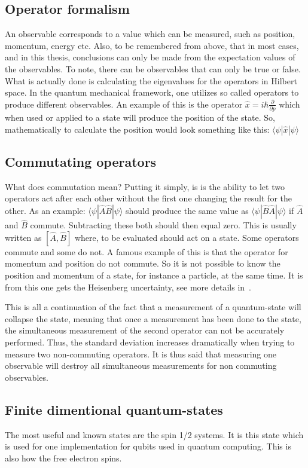 \documentclass[
  utf8,%
  parskip,%
  largesmallcaps,intlimits,widermath,%
  sharecounter,nobreak,definition=marks,%
  noparts%
]{rtthesis}
\begin{document}
\subsection{Operator formalism}\label{sec:intro:Background of quantum mechanics:Operator formalism}
An observable corresponds to a value which can be measured, such as position, momentum, energy etc. Also, to be remembered from above, that in most cases, and in this thesis, conclusions can only be made from the expectation values of the observables. To note, there can be observables that can only be true or false. What is actually done is calculating the eigenvalues for the operators in Hilbert space. In the quantum mechanical framework, one utilizes so called operators to produce different observables. An example of this is the operator $\hat{x} = i\hbar\frac{\partial}{\partial p}$   
which when used or applied to a state will produce the position of the state.  So, mathematically to calculate the position would look something like this: $\langle\psi|\hat{x}|\psi\rangle$ 
\subsection{Commutating operators}
What does commutation mean?
Putting it simply, is is the ability to let two operators act after each other without the first one changing the result for the other. As an example: $\langle\psi|\hat{A}\hat{B}|\psi\rangle$ should produce the same value as $\langle\psi|\hat{B}\hat{A}|\psi\rangle$ if $\hat{A}$ and $\hat{B}$ commute. Subtracting these both should then equal zero. This is usually written as $[\hat{A},\hat{B}]$ where, to be evaluated should act on a state.
Some operators commute and some do not. A famous example of this is that the operator for momentum and position do not commute. So it is not possible to know the position and momentum of a state, for instance a particle, at the same time. It is from this one gets the Heisenberg uncertainty, see more details in~\cite{Bransden:2000}.

This is all a continuation of the fact that a measurement of a quantum-state will collapse the state, meaning that once a measurement has been done to the state, the simultaneous measurement of the second operator can not be accurately performed. Thus, the standard deviation increases dramatically when trying to measure two non-commuting operators. It is thus said that measuring one observable will destroy all simultaneous measurements for non commuting observables.
\subsection{Finite dimentional quantum-states}\label{sec:intro:Background of quantum mechanics:Finite dimentional quantum-states}
The most useful and known states are the spin 1/2 systems. It is this state which is used for one implementation for qubits used in quantum computing. This is also how the free electron spins. 
\end{document}
